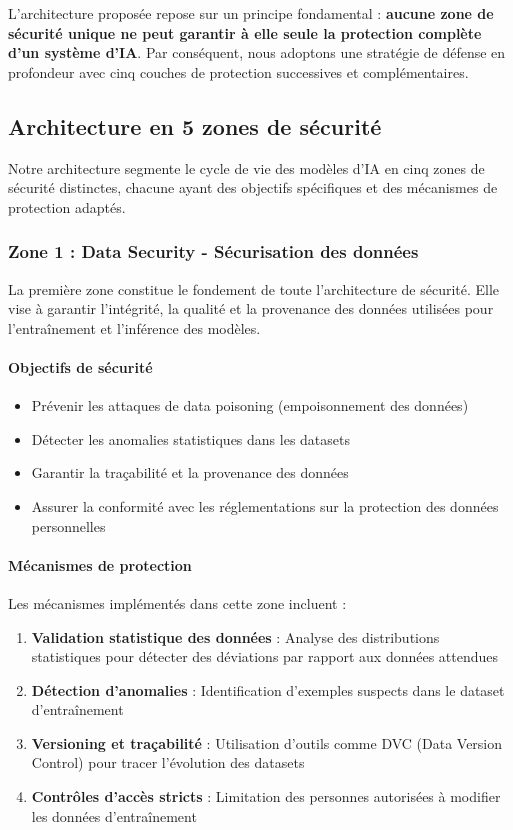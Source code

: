 L'architecture proposée repose sur un principe fondamental : \textbf{aucune zone de sécurité unique ne peut garantir à elle seule la protection complète d'un système d'IA}. Par conséquent, nous adoptons une stratégie de défense en profondeur avec cinq couches de protection successives et complémentaires.

\subsection{Architecture en 5 zones de sécurité}

Notre architecture segmente le cycle de vie des modèles d'IA en cinq zones de sécurité distinctes, chacune ayant des objectifs spécifiques et des mécanismes de protection adaptés.

\subsubsection{Zone 1 : Data Security - Sécurisation des données}

La première zone constitue le fondement de toute l'architecture de sécurité. Elle vise à garantir l'intégrité, la qualité et la provenance des données utilisées pour l'entraînement et l'inférence des modèles.

\paragraph{Objectifs de sécurité}
\begin{itemize}
    \item Prévenir les attaques de data poisoning (empoisonnement des données)
    \item Détecter les anomalies statistiques dans les datasets
    \item Garantir la traçabilité et la provenance des données
    \item Assurer la conformité avec les réglementations sur la protection des données personnelles
\end{itemize}

\paragraph{Mécanismes de protection}
Les mécanismes implémentés dans cette zone incluent :

\begin{enumerate}
    \item \textbf{Validation statistique des données} : Analyse des distributions statistiques pour détecter des déviations par rapport aux données attendues
    \item \textbf{Détection d'anomalies} : Identification d'exemples suspects dans le dataset d'entraînement
    \item \textbf{Versioning et traçabilité} : Utilisation d'outils comme DVC (Data Version Control) pour tracer l'évolution des datasets
    \item \textbf{Contrôles d'accès stricts} : Limitation des personnes autorisées à modifier les données d'entraînement
\end{enumerate}

